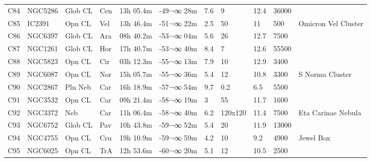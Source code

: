 \documentclass[10pt,twoside,a4paper,english]{report}
\begin{document}
\begin{longtable}{@{}lllllllllll@{}}
C84        & NGC5286     & Glob CL    & Cen       & 13h 05.4m & -49¬∞ 28m  & 7.6       & 9                    & 12.4     & 36000               &                                 \\ 
C85        & IC2391      & Opn CL     & Vel       & 13h 46.4m & -51¬∞ 22m  & 2.5       & 50                   & 11       & 500                 & Omicron Vel Cluster             \\ 
C86        & NGC6397     & Glob CL    & Ara       & 08h 40.2m & -53¬∞ 04m  & 5.6       & 26                   & 12.7     & 7500                &                                 \\ 
C87        & NGC1261     & Glob CL    & Hor       & 17h 40.7m & -53¬∞ 40m  & 8.4       & 7                    & 12.6     & 55500               &                                 \\ 
C88        & NGC5823     & Opn CL     & Cir       & 03h 12.3m & -55¬∞ 13m  & 7.9       & 10                   & 12.9     & 3400                &                                 \\ 
C89        & NGC6087     & Opn CL     & Nor       & 15h 05.7m & -55¬∞ 36m  & 5.4       & 12                   & 10.8     & 3300                & S Norma Cluster                 \\ 
C90        & NGC2867     & Pln Neb    & Car       & 16h 18.9m & -57¬∞ 54m  & 9.7       & 0.2                  & 6.5      & 5500                &                                 \\ 
C91        & NGC3532     & Opn CL     & Car       & 09h 21.4m & -58¬∞ 19m  & 3         & 55                   & 11.7     & 1600                &                                 \\ 
C92        & NGC3372     & Neb        & Car       & 11h 06.4m & -58¬∞ 40m  & 6.2       & 120x120              & 11.4     & 7500                & Eta Carinae Nebula              \\ 
C93        & NGC6752     & Glob CL    & Pav       & 10h 43.8m & -59¬∞ 52m  & 5.4       & 20                   & 11.9     & 13000               &                                 \\ 
C94        & NGC4755     & Opn CL     & Cru       & 19h 10.9m & -59¬∞ 59m  & 4.2       & 10                   & 9.2      & 4900                & Jewel Box                       \\ 
C95        & NGC6025     & Opn CL     & TrA       & 12h 53.6m & -60¬∞ 20m  & 5.1       & 12                   & 10.5     & 2500                &                                 \\ 

\end{longtable}
\end{document}
